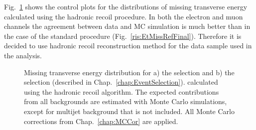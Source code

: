Fig.~\ref{ris:HadrRecoilEtMiss} shows the control plots for the distributions of missing transverse energy calculated using the hadronic recoil procedure. In both the electron and muon channels the agreement between data and MC simulation is much better than in the case of the standard procedure (Fig.~\ref{ris:EtMissRefFinal}).  Therefore it is decided to use hadronic recoil \etmiss reconstruction method for the data sample used in the analysis.


\begin{figure}[!tbp]
\begin{minipage}[h]{0.49\linewidth}
\end{minipage}
\hfill
\begin{minipage}[h]{0.49\linewidth}
\end{minipage}
\caption{Missing transverse energy distribution for a) the \wenu selection and  b) the \wmunu selection (described in Chap.~\ref{chap:EventSelection}). \etmiss  calculated using the hadronic recoil algorithm. The expected contributions from all backgrounds are estimated with Monte Carlo simulations, except for multijet background that is not included. All Monte Carlo corrections from Chap.~\ref{chap:MCCor} are applied.}
\label{ris:HadrRecoilEtMiss}
\end{figure}


